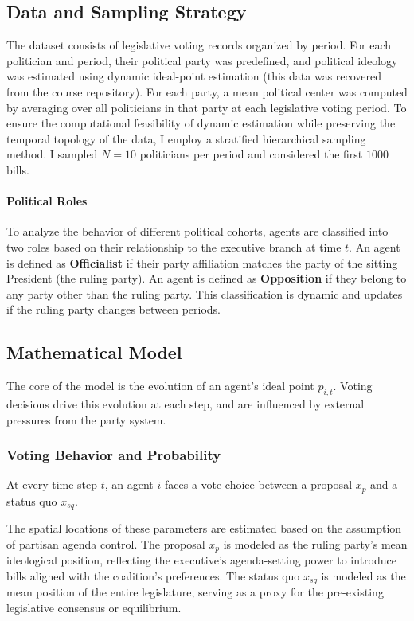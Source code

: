 \documentclass{article}
\begin{document}
	\subsection{Data and Sampling Strategy}
	The dataset consists of legislative voting records organized by period. For each politician and period, their political party was predefined, and political ideology was estimated using dynamic ideal-point estimation (this data was recovered from the course repository). For each party, a mean political center was computed by averaging over all politicians in that party at each legislative voting period. To ensure the computational feasibility of dynamic estimation while preserving the temporal topology of the data, I employ a stratified hierarchical sampling method. I sampled $N = 10$ politicians per period and considered the first $1000$ bills.
	
	\paragraph{Political Roles}
	To analyze the behavior of different political cohorts, agents are classified into two roles based on their relationship to the executive branch at time $t$. An agent is defined as \textbf{Officialist} if their party affiliation matches the party of the sitting President (the ruling party). An agent is defined as \textbf{Opposition} if they belong to any party other than the ruling party. This classification is dynamic and updates if the ruling party changes between periods.
	
	\subsection{Mathematical Model}
	
	The core of the model is the evolution of an agent's ideal point $p_{i,t}$. Voting decisions drive this evolution at each step, and are influenced by external pressures from the party system.
	
	\subsubsection{Voting Behavior and Probability}
	At every time step $t$, an agent $i$ faces a vote choice between a proposal $x_p$ and a status quo $x_{sq}$. 
	
	The spatial locations of these parameters are estimated based on the assumption of partisan agenda control. The proposal $x_p$ is modeled as the ruling party's mean ideological position, reflecting the executive's agenda-setting power to introduce bills aligned with the coalition's preferences. The status quo $x_{sq}$ is modeled as the mean position of the entire legislature, serving as a proxy for the pre-existing legislative consensus or equilibrium.
	
\end{document}
